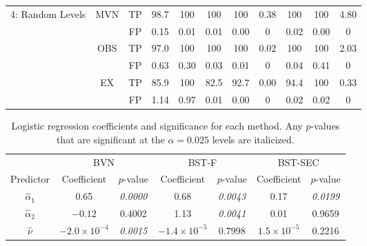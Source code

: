 \documentclass[12pt]{article}
\begin{document}
\begin{table}
\begin{center}
\begin{tabular}{c|cc|c|c|ccc|ccc}
\multirow{6}{*}{4: Random Levels}&\multirow{2}{*}{MVN}&TP&98.7 &100&100&100&0.38&100&100&4.80 \\
	&&FP & 0.15 &0.01&0.01&0.00&0&0.02&0.00 &0\\
\cline{2-11}

&\multirow{2}{*}{OBS}&TP& 97.0 &100&100&100&0.02&100&100&2.03 \\
&&FP &0.63 &0.30&0.03&0.01&0&0.04&0.41&0 \\
\cline{2-11}
&\multirow{2}{*}{EX}&TP& 85.9 &100 &82.5&92.7&0.00&94.4&100&0.33 \\
&&FP& 1.14 & 0.97&0.01&0.00&0&0.02&0.02&0\\

\hline\hline




\end{tabular}
\end{center}\label{tab:sim1}
\end{table}

 



\begin{table}
\caption{Logistic regression coefficients and significance  for each method.  Any $p$-values that are significant at the $\alpha = 0.025$ levels are italicized.  }
\begin{center}
\begin{tabular}{c|cc|cc|cc}
\hline
			& \multicolumn{2}{c|}{BVN} & \multicolumn{2}{c|}{BST-F} & \multicolumn{2}{c}{BST-SEC} \\
Predictor & Coefficient & $p$-value &  Coefficient & $p$-value & Coefficient & $p$-value\\
\hline
$\hat \alpha_1$ & 0.65 & \emph{0.0000} & 0.68 & \emph{0.0043} & 0.17 & \emph{0.0199} \\
$\hat \alpha_2$ & $-0.12$ & 0.4002 & 1.13 & \emph{0.0041} & 0.01 & 0.9659\\
$\hat \nu$ &  $-2.0\times10^{-4}$ &\emph{0.0015} & $-1.4\times 10 ^{-5}$ & 0.7998 & $1.5\times 10^{-5}$ & 0.2216\\
\hline

\end{tabular}
\end{center}\label{tab:logistic}
\end{table}

\end{document}
